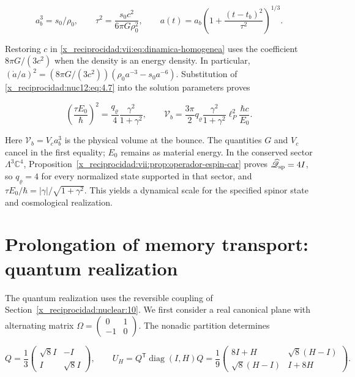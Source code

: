 \[
a_b^3=s_0/\rho_0,\qquad
\tau^2=\frac{s_0c^2}{6\pi G\rho_0^2},\qquad
a(t)=a_b\left(1+\frac{(t-t_b)^2}{\tau^2}\right)^{1/3}.
\]



Restoring \(c\) in \eqref{x_reciprocidad:vii:eq:dinamica-homogenea} uses the coefficient \(8\pi G/(3c^2)\) when the density is an energy density. In particular, \((\dot a/a)^2=(8\pi G/(3c^2))(\rho_0a^{-3}-s_0a^{-6})\). Substitution of \eqref{x_reciprocidad:nuc12:eq:4.7} into the solution parameters proves



\begin{equation}
\boxed{\left(\frac{\tau E_0}{\hbar}\right)^2
=\frac{q_\varrho}{4}\frac{\gamma^2}{1+\gamma^2},\qquad
\mathcal V_b=\frac{3\pi}{2}q_\varrho
\frac{\gamma^2}{1+\gamma^2}\ell_P^2\frac{\hbar c}{E_0}.}
\label{x_reciprocidad:nuc12:eq:4.8}
\end{equation}



Here \(\mathcal V_b=V_c a_b^3\) is the physical volume at the bounce. The quantities \(G\) and \(V_c\) cancel in the first equality; \(E_0\) remains as material energy. In the conserved sector \(\Lambda^3\mathbb C^4\), Proposition~\ref{x_reciprocidad:vii:prop:operador-espin-car} proves \(\widehat{\mathscr Q}_{\rm sp}=4I\), so \(q_\varrho=4\) for every normalized state supported in that sector, and \(\tau E_0/\hbar=|\gamma|/\sqrt{1+\gamma^2}\). This yields a dynamical scale for the specified spinor state and cosmological realization.

\section{Prolongation of memory transport: quantum realization}

The quantum realization uses the reversible coupling of Section~\ref{x_reciprocidad:nuclear:10}. We first consider a real canonical plane with alternating matrix \(\Omega=\left(\begin{smallmatrix}0&1\\-1&0\end{smallmatrix}\right)\). The nonadic partition determines



\begin{equation}
Q=\frac13\begin{pmatrix}\sqrt8 I&-I\\I&\sqrt8 I\end{pmatrix},\qquad
U_H=Q^{\mathsf T}\operatorname{diag}(I,H)Q
=\frac19\begin{pmatrix}8I+H&\sqrt8(H-I)\\
\sqrt8(H-I)&I+8H\end{pmatrix}.
\label{x_reciprocidad:nuc12:eq:5.1}
\end{equation}



